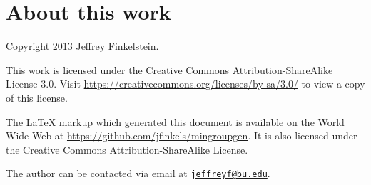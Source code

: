 \documentclass{article}
\newcommand{\email}[1]{\href{mailto:#1}{\nolinkurl{#1}}}
\begin{document}
\section{About this work}

Copyright 2013 Jef{}frey Finkelstein.

This work is licensed under the Creative Commons Attribution-ShareAlike License 3.0.
Visit \mbox{\url{https://creativecommons.org/licenses/by-sa/3.0/}} to view a copy of this license.

The \LaTeX{} markup which generated this document is available on the World Wide Web at \mbox{\url{https://github.com/jfinkels/mingroupgen}}.
It is also licensed under the Creative Commons Attribution-ShareAlike License.

The author can be contacted via email at \email{jeffreyf@bu.edu}.



\end{document}
